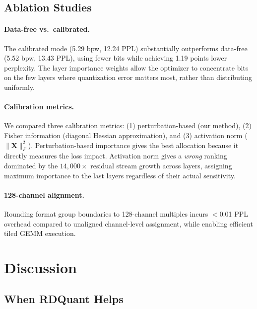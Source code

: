 \documentclass{article}
\begin{document}
\subsection{Ablation Studies}
\label{sec:ablation}

\paragraph{Data-free vs.\ calibrated.}
The calibrated mode (5.29 bpw, 12.24 PPL) substantially outperforms data-free (5.52 bpw, 13.43 PPL), using fewer bits while achieving 1.19 points lower perplexity.
The layer importance weights allow the optimizer to concentrate bits on the few layers where quantization error matters most, rather than distributing uniformly.

\paragraph{Calibration metrics.}
We compared three calibration metrics: (1) perturbation-based (our method), (2) Fisher information (diagonal Hessian approximation), and (3) activation norm ($\|\mathbf{X}\|_F^2$).
Perturbation-based importance gives the best allocation because it directly measures the loss impact.
Activation norm gives a \emph{wrong} ranking dominated by the $14{,}000\times$ residual stream growth across layers, assigning maximum importance to the last layers regardless of their actual sensitivity.

\paragraph{128-channel alignment.}
Rounding format group boundaries to 128-channel multiples incurs $<$0.01 PPL overhead compared to unaligned channel-level assignment, while enabling efficient tiled GEMM execution.

\section{Discussion}
\label{sec:discussion}

\subsection{When RDQuant Helps}
\end{document}
